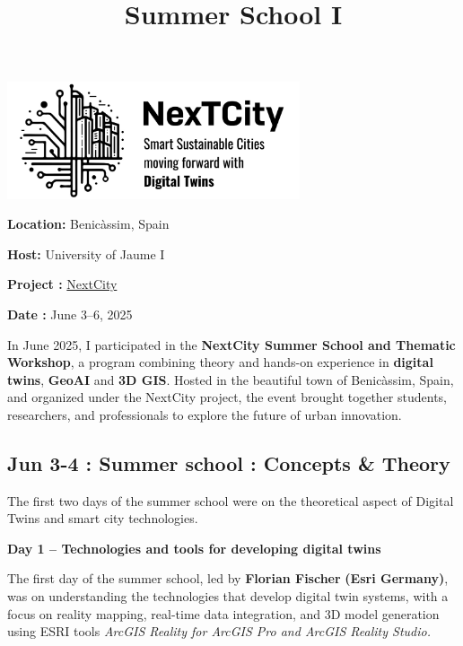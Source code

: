 \documentclass[
  letterpaper,
  DIV=11,
  numbers=noendperiod]{scrartcl}
\title{Summer School I}
\author{}
\date{}
\renewcommand*\contentsname{Table of contents}
\newcommand\contentsname{Table of contents}
\begin{document}
\maketitle

\renewcommand*\contentsname{Table of contents}
{
\hypersetup{linkcolor=}
\setcounter{tocdepth}{3}
\tableofcontents
}

\begin{center}
\includegraphics[width=3.39583in,height=\textheight]{images/ss logo.jpg}
\end{center}

\textbf{Location:} Benicàssim, Spain

\textbf{Host:} University of Jaume I

\textbf{Project :}
\href{https://experience.arcgis.com/experience/2dbbd653dec545038635c3ebe36d8432/page/About-Nextcity}{NextCity}

\textbf{Date :} June 3--6, 2025

In June 2025, I participated in the \textbf{NextCity Summer School and
Thematic Workshop}, a program combining theory and hands-on experience
in \textbf{digital twins}, \textbf{GeoAI} and \textbf{3D GIS}. Hosted in
the beautiful town of Benicàssim, Spain, and organized under the
NextCity project, the event brought together students, researchers, and
professionals to explore the future of urban innovation.

\subsection{\texorpdfstring{\textbf{Jun 3-4 : Summer school : Concepts
\&
Theory}}{Jun 3-4 : Summer school : Concepts \& Theory}}\label{jun-3-4-summer-school-concepts-theory}

The first two days of the summer school were on the theoretical aspect
of Digital Twins and smart city technologies.

\textbf{Day 1 -- Technologies and tools for developing digital twins}

The first day of the summer school, led by \textbf{Florian Fischer}
\textbf{(Esri Germany)}, was on understanding the technologies that
develop digital twin systems, with a focus on reality mapping, real-time
data integration, and 3D model generation using ESRI tools \emph{ArcGIS
Reality for ArcGIS Pro and ArcGIS Reality Studio.}
\end{document}
